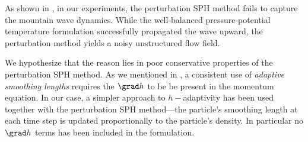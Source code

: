 \documentclass[../main.tex]{subfiles}
\begin{document}
As shown in , in our experiments, the perturbation SPH method fails to capture the mountain wave dynamics. While the well-balanced pressure-potential temperature formulation successfully propagated the wave upward, the perturbation method yields a noisy unstructured flow field. 

We hypothesize that the reason lies in poor conservative properties of the perturbation SPH method. As we mentioned in , a consistent use of \emph{adaptive smoothing lengths} requires the $\grad h$ to be be present in the momentum equation. In our case, a simpler approach to $h-$adaptivity has been used together with the perturbation SPH method---the particle's smoothing length at each time step is updated proportionally to the particle's density. In particular no $\grad h$ terms has been included in the formulation.
\end{document}

